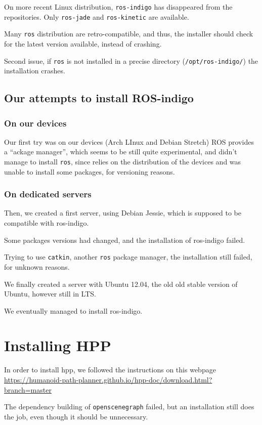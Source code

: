\documentclass[a4paper, 11pt, titlepage]{article}
\begin{document}
On more recent Linux distribution, \verb|ros-indigo| has disappeared from the
repositories. Only \verb|ros-jade| and \verb|ros-kinetic| are available.

Many \verb|ros| distribution are retro-compatible, and thus, the installer
should check for the latest version available, instead of crashing.

Second issue, if \verb|ros| is not installed in a precise directory
(\verb|/opt/ros-indigo/|) the installation crashes.

\subsection{Our attempts to install ROS-indigo}

\subsubsection{On our devices}

    Our first try was on our devices (Arch LInux and Debian Stretch)
    ROS provides a ``ackage manager'', which seems to be still quite
    experimental, and didn't manage to install \verb|ros|, since relies on the
    distribution of the devices and was unable to install some packages, for
    versioning reasons.

\subsubsection{On dedicated servers}

    Then, we created a first server, using Debian Jessie, which is supposed to
    be compatible with ros-indigo.

    Some packages versions had changed, and the installation of ros-indigo failed.

    Trying to use \verb|catkin|, another \verb|ros| package manager, the
    installation still failed, for unknown reasons.

    We finally created a server with Ubuntu 12.04, the old old stable version of
    Ubuntu, however still in LTS\@.

    We eventually managed to install ros-indigo.

\section{Installing HPP}

In order to install hpp, we followed the instructions on this webpage
\url{https://humanoid-path-planner.github.io/hpp-doc/download.html?branch=master}

The dependency building of \verb|openscenegraph| failed, but an installation
still does the job, even though it should be unnecessary.
\end{document}
